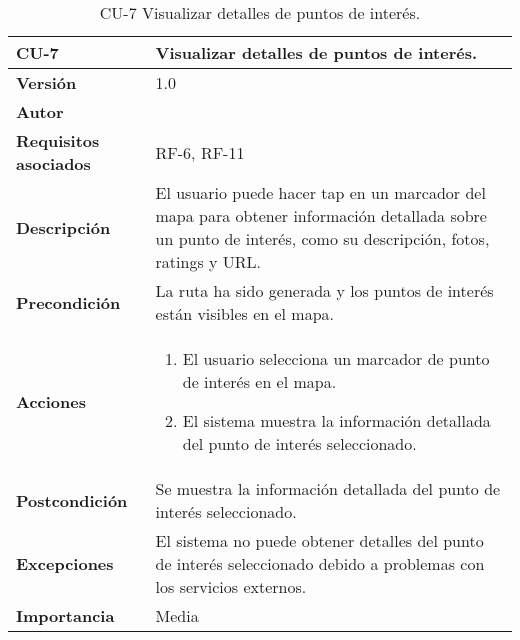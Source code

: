 \begin{table}[p]
	\centering
	\begin{tabularx}{\linewidth}{ p{} p{} }
		\toprule
		\textbf{CU-7}    & \textbf{Visualizar detalles de puntos de interés.}\\
		\toprule
		\textbf{Versión}              & 1.0    \\
		\textbf{Autor}                & \autor \\
		\textbf{Requisitos asociados} & RF-6, RF-11 \\
		\textbf{Descripción}          & El usuario puede hacer tap en un marcador del mapa para obtener información detallada sobre un punto de interés, como su descripción, fotos, ratings y URL. \\
		\textbf{Precondición}         & La ruta ha sido generada y los puntos de interés están visibles en el mapa. \\
		\textbf{Acciones}             &
		\begin{enumerate}
			\def\labelenumi{\arabic{enumi}.}
			\tightlist
			\item El usuario selecciona un marcador de punto de interés en el mapa.
			\item El sistema muestra la información detallada del punto de interés seleccionado.
		\end{enumerate}\\
		\textbf{Postcondición}        & Se muestra la información detallada del punto de interés seleccionado. \\
		\textbf{Excepciones}          & El sistema no puede obtener detalles del punto de interés seleccionado debido a problemas con los servicios externos. \\
		\textbf{Importancia}          & Media \\
		\bottomrule
	\end{tabularx}
	\caption{CU-7 Visualizar detalles de puntos de interés.}
\end{table}

